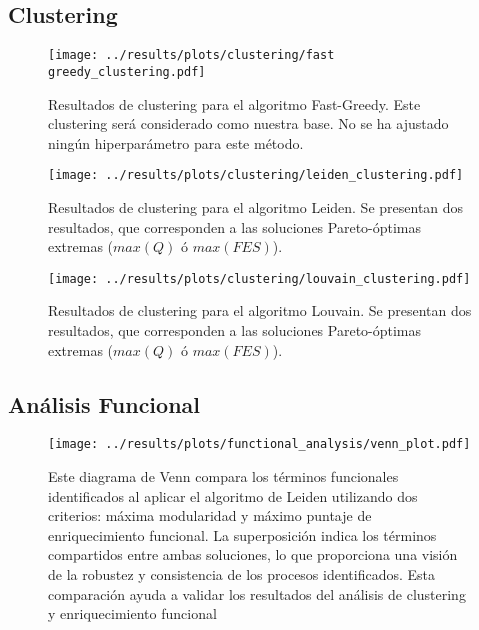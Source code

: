 \subsection{Clustering}

\begin{figure}[htbp]
	\centering
	\texttt{[image: ../results/plots/clustering/fast greedy\_clustering.pdf]}
	\caption{Resultados de clustering para el algoritmo Fast-Greedy. Este clustering será considerado como nuestra base. No se ha ajustado ningún hiperparámetro para este método.}
	\label{fig:fastgreedy_clustering}
\end{figure}

\begin{figure}[htbp]
	\centering
	\texttt{[image: ../results/plots/clustering/leiden\_clustering.pdf]}
	\caption{Resultados de clustering para el algoritmo Leiden. Se presentan dos resultados, que corresponden a las soluciones Pareto-óptimas extremas (\(max(Q)\) ó \(max(FES)\)).}
	\label{fig:leiden_clustering}
\end{figure}

\begin{figure}[htbp]
	\centering
	\texttt{[image: ../results/plots/clustering/louvain\_clustering.pdf]}
	\caption{Resultados de clustering para el algoritmo Louvain. Se presentan dos resultados, que corresponden a las soluciones Pareto-óptimas extremas (\(max(Q)\) ó \(max(FES)\)).}
	\label{fig:louvain_clustering}
\end{figure}

\subsection{Análisis Funcional}


\begin{figure}[htbp]
	\centering
	\texttt{[image: ../results/plots/functional\_analysis/venn\_plot.pdf]}
	\caption{Este diagrama de Venn compara los términos funcionales identificados al aplicar el algoritmo de Leiden utilizando dos criterios: máxima modularidad y máximo puntaje de enriquecimiento funcional. La superposición indica los términos compartidos entre ambas soluciones, lo que proporciona una visión de la robustez y consistencia de los procesos identificados. Esta comparación ayuda a validar los resultados del análisis de clustering y enriquecimiento funcional​}
	\label{fig:venn_plot}
\end{figure}


